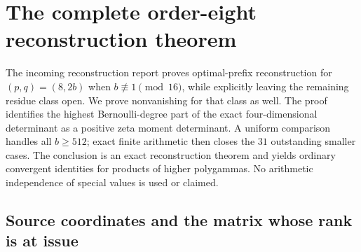 \section{The complete order-eight reconstruction theorem}
\label{r8c:section}

The incoming reconstruction report \cite[Section 5]{Reconstruction} proves
optimal-prefix reconstruction for $(p,q)=(8,2b)$ when
$b\not\equiv1\pmod {16}$, while explicitly leaving the remaining
residue class open. We prove nonvanishing for that class as well.
The proof identifies the highest Bernoulli-degree part of the exact
four-dimensional determinant as a positive zeta moment determinant.
A uniform comparison handles all $b\ge512$; exact finite arithmetic
then closes the $31$ outstanding smaller cases. The conclusion is an
exact reconstruction theorem and yields ordinary convergent identities
for products of higher polygammas. No arithmetic independence of
special values is used or claimed.

\subsection{Source coordinates and the matrix whose rank is at issue}

